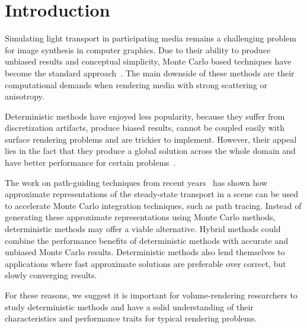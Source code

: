 \documentclass{egpubl}
\newcommand{\nocontentsline}[3]{}
\newcommand{\tocless}[2]{\bgroup\let\addcontentsline=\nocontentsline#1{#2}\egroup}
\begin{document}

\tocless\section{Introduction}

Simulating light transport in participating media remains a challenging problem for image synthesis in computer graphics. Due to their ability to produce unbiased results and conceptual simplicity, Monte Carlo based techniques have become the standard approach~\cite{Novak18}. The main downside of these methods are their computational demands when rendering media with strong scattering or anisotropy.

Deterministic methods have enjoyed less popularity, because they suffer from discretization artifacts, produce biased results, cannot be coupled easily with surface rendering problems and are trickier to implement. However, their appeal lies in the fact that they produce a global solution across the whole domain and have better performance for certain problems~\cite{Brunner02}.

The work on path-guiding techniques from recent years~\cite{Muller17} has shown how approximate representations of the steady-state transport in a scene can be used to accelerate Monte Carlo integration techniques, such as path tracing. Instead of generating these approximate representations using Monte Carlo methods, deterministic methods may offer a viable alternative. Hybrid methods could combine the performance benefits of deterministic methods with accurate and unbiased Monte Carlo results.
Deterministic methods also lend themselves to applications where fast approximate solutions are preferable over correct, but slowly converging results. 

For these reasons, we suggest it is important for volume-rendering researchers to study deterministic methods and have a solid understanding of their characteristics and performance traits for typical rendering problems.
\end{document}
